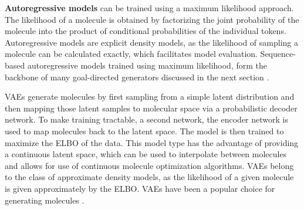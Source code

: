 \textbf{Autoregressive models} can be trained using a maximum likelihood approach. The likelihood of
a molecule is obtained by factorizing the joint probability of the molecule into the product of
conditional probabilities of the individual tokens. Autoregressive models are explicit density
models, as the likelihood of sampling a molecule can be calculated exactly, which facilitates model
evaluation. Sequence-based autoregressive models trained using maximum likelihood, form the backbone
of many goal-directed generators discussed in the next section
\citep{gomez-bombarelliAutomaticChemicalDesign2018,seglerGeneratingFocusedMolecule2018,olivecronaMolecularDenovoDesign2017,guoAugmentedMemorySampleEfficient2024,thomasAugmentedHillClimbIncreases2022,jaquesSequenceTutorConservative2016,cohen-karlikOvercomingOrderAutoregressive2024}.

\Acp{VAE} \citep{kingmaAutoEncodingVariationalBayes2013} generate molecules by first sampling from a
simple latent distribution and then mapping those latent samples to molecular space via a
probabilistic decoder network. To make training tractable, a second network, the encoder network is
used to map molecules back to the latent space. The model is then trained to maximize the \ac{ELBO}
of the data.
This model type has the advantage of providing a continuous latent space, which can be used to
interpolate between molecules and allows for use of continuous molecule optimization algorithms.
\acp{VAE} belong to the class of approximate density models, as the likelihood of
a given molecule is given approximately by the \ac{ELBO}. \acp{VAE} have been a
popular choice for generating molecules
\citep{gomez-bombarelliAutomaticChemicalDesign2018,kusnerGrammarVariationalAutoencoder2017,simonovskyGraphVAEGenerationSmall2018,samantaNEVAEDeepGenerative2020,jinJunctionTreeVariational2018,daiSyntaxDirectedVariationalAutoencoder2018,liuConstrainedGraphVariational2018}.

